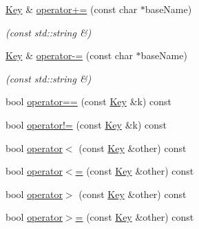 \begin{DoxyCompactItemize}
\hyperlink{classkdb_1_1Key}{Key} \& \hyperlink{classkdb_1_1Key_a743cd179805cd28bdef4f4552dfcfad4}{operator+=} (const char $\ast$base\-Name)
\begin{DoxyCompactList}\small\item\em (const std\-::string \&) \end{DoxyCompactList}\item 
\hyperlink{classkdb_1_1Key}{Key} \& \hyperlink{classkdb_1_1Key_a12780da0f5775c0ce40e4d069b4606e3}{operator-\/=} (const char $\ast$base\-Name)
\begin{DoxyCompactList}\small\item\em (const std\-::string \&) \end{DoxyCompactList}\item 
bool \hyperlink{classkdb_1_1Key_abaff8356eb91a6d3aed2b6d282269da2}{operator==} (const \hyperlink{classkdb_1_1Key}{Key} \&k) const 
\begin{DoxyCompactList}\small\item\em \end{DoxyCompactList}\item 
bool \hyperlink{classkdb_1_1Key_a313a84b686a72769ecf4c368a79d492c}{operator!=} (const \hyperlink{classkdb_1_1Key}{Key} \&k) const 
\begin{DoxyCompactList}\small\item\em \end{DoxyCompactList}\item 
bool \hyperlink{classkdb_1_1Key_aace409efd393ae21f08d333f45da2769}{operator$<$} (const \hyperlink{classkdb_1_1Key}{Key} \&other) const 
\begin{DoxyCompactList}\small\item\em \end{DoxyCompactList}\item 
bool \hyperlink{classkdb_1_1Key_a3b466f59870b989aa9ec41558bba4d19}{operator$<$=} (const \hyperlink{classkdb_1_1Key}{Key} \&other) const 
\begin{DoxyCompactList}\small\item\em \end{DoxyCompactList}\item 
bool \hyperlink{classkdb_1_1Key_a1bd2b165eeade6a71401b9b122864bad}{operator$>$} (const \hyperlink{classkdb_1_1Key}{Key} \&other) const 
\begin{DoxyCompactList}\small\item\em \end{DoxyCompactList}\item 
bool \hyperlink{classkdb_1_1Key_aa1258657e3dbddf4aed3716dd63d2a3c}{operator$>$=} (const \hyperlink{classkdb_1_1Key}{Key} \&other) const 

\end{DoxyCompactItemize}
